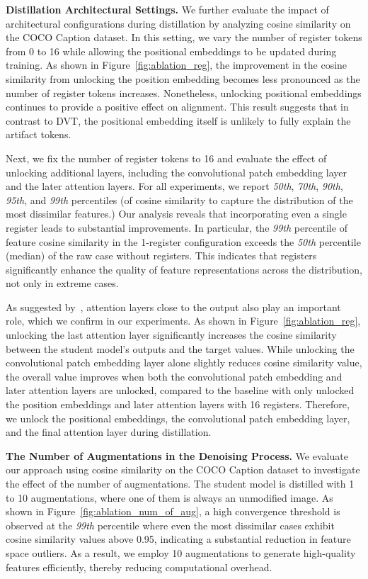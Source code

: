 \textbf{Distillation Architectural Settings.} We further evaluate the impact of architectural configurations during distillation by analyzing cosine similarity on the COCO Caption dataset. In this setting, we vary the number of register tokens from 0 to 16 while allowing the positional embeddings to be updated during training. As shown in Figure~\ref{fig:ablation_reg}, the improvement in the cosine similarity from unlocking the position embedding becomes less pronounced as the number of register tokens increases. Nonetheless, unlocking positional embeddings continues to provide a positive effect on alignment. This result suggests that in contrast to DVT, the positional embedding itself is unlikely to fully explain the artifact tokens. 

Next, we fix the number of register tokens to 16 and evaluate the effect of unlocking additional layers, including the convolutional patch embedding layer and the later attention layers. For all experiments, we report \textit{50th}, \textit{70th}, \textit{90th}, \textit{95th}, and \textit{99th} percentiles (of cosine similarity to capture the distribution of the most dissimilar features.) Our analysis reveals that incorporating even a single register leads to substantial improvements. In particular, the \textit{99th} percentile of feature cosine similarity in the 1-register configuration exceeds the \textit{50th} percentile (median) of the raw case without registers. This indicates that registers significantly enhance the quality of feature representations across the distribution, not only in extreme cases.

As suggested by~\citep{wang2024sinder,yang2024denoising}, attention layers close to the output also play an important role, which we confirm in our experiments. As shown in Figure~\ref{fig:ablation_reg}, unlocking the last attention layer significantly increases the cosine similarity between the student model's outputs and the target values. While unlocking the convolutional patch embedding layer alone slightly reduces cosine similarity value, the overall value improves when both the convolutional patch embedding and later attention layers are unlocked, compared to the baseline with only unlocked the position embeddings and later attention layers with 16 registers. Therefore, we unlock the positional embeddings, the convolutional patch embedding layer, and the final attention layer during distillation.

\textbf{The Number of Augmentations in the Denoising Process.}
We evaluate our approach using cosine similarity on the COCO Caption dataset to investigate the effect of the number of augmentations. The student model is distilled with 1 to 10 augmentations, where one of them is always an unmodified image.
As shown in Figure~\ref{fig:ablation_num_of_aug}, a high convergence threshold is observed at the \textit{99th} percentile where even the most dissimilar cases exhibit cosine similarity values above 0.95, indicating a substantial reduction in feature space outliers.
As a result, we employ 10 augmentations to generate high-quality features efficiently, thereby reducing computational overhead.

